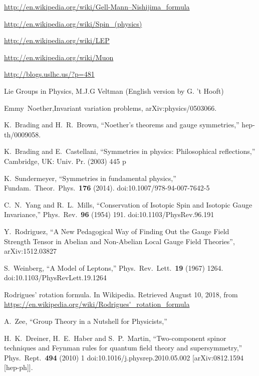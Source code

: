 \begin{thebibliography}{999}
\url{http://en.wikipedia.org/wiki/Gell-Mann–Nishijima_formula}

\url{http://en.wikipedia.org/wiki/Spin_(physics)}

\url{http://en.wikipedia.org/wiki/LEP}

\url{http://en.wikipedia.org/wiki/Muon}

\url{http://blogs.uslhc.us/?p=481}

 Lie Groups in Physics, M.J.G Veltman (English version by G. 't Hooft)

 Emmy~Noether,Invariant variation problems, arXiv:physics/0503066.
  
  K.~Brading and H.~R.~Brown,
  ``Noether's theorems and gauge symmetries,''
  hep-th/0009058.


  K.~Brading and E.~Castellani,
  ``Symmetries in physics: Philosophical reflections,''
  Cambridge, UK: Univ. Pr. (2003) 445 p

  K.~Sundermeyer,
  ``Symmetries in fundamental physics,''
  Fundam.\ Theor.\ Phys.\  {\bf 176} (2014).
  doi:10.1007/978-94-007-7642-5


  C.~N.~Yang and R.~L.~Mills,
  ``Conservation of Isotopic Spin and Isotopic Gauge Invariance,''
  Phys.\ Rev.\  {\bf 96} (1954) 191.
  doi:10.1103/PhysRev.96.191

Y.~Rodriguez, ``A New Pedagogical Way of Finding Out the Gauge Field Strength Tensor in Abelian and Non-Abelian Local Gauge Field Theories'', arXiv:1512.03827



  S.~Weinberg,
  ``A Model of Leptons,''
  Phys.\ Rev.\ Lett.\  {\bf 19} (1967) 1264.
  doi:10.1103/PhysRevLett.19.1264

 Rodrigues' rotation formula. In Wikipedia. Retrieved August 10, 2018, from \url{https://en.wikipedia.org/wiki/Rodrigues'_rotation_formula}


  A.~Zee,
  ``Group Theory in a Nutshell for Physicists,''

  H.~K.~Dreiner, H.~E.~Haber and S.~P.~Martin,
  ``Two-component spinor techniques and Feynman rules for quantum field theory and supersymmetry,''
  Phys.\ Rept.\  {\bf 494} (2010) 1
  doi:10.1016/j.physrep.2010.05.002
  [arXiv:0812.1594 [hep-ph]].



\end{thebibliography}
